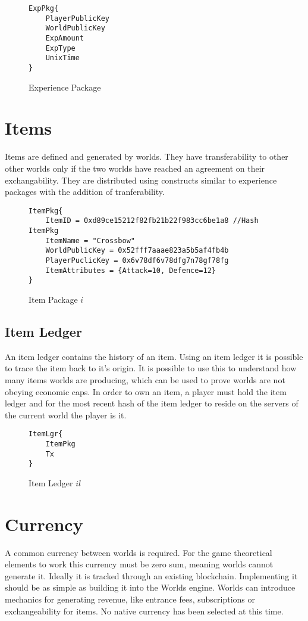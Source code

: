 \documentclass[runningheads,a4paper]{llncs}
\begin{document}
\begin{figure}[H]
\centering
\label{exppkg}
\caption{Experience Package}
\begin{lstlisting}
ExpPkg{
	PlayerPublicKey
	WorldPublicKey
	ExpAmount
	ExpType
	UnixTime
}
\end{lstlisting}
\end{figure}

\section{Items} 
\label{items}
Items are defined and generated by worlds. They have transferability to other other worlds only if the two worlds have reached an agreement on their exchangability. They are distributed using constructs similar to experience packages with the addition of tranferability.

\begin{figure}[H]
\centering
\label{itempkg}
\caption{Item Package $i$}
\begin{lstlisting}
ItemPkg{
	ItemID = 0xd89ce15212f82fb21b22f983cc6be1a8 //Hash ItemPkg 
	ItemName = "Crossbow"
	WorldPublicKey = 0x52fff7aaae823a5b5af4fb4b
	PlayerPuclicKey = 0x6v78df6v78dfg7n78gf78fg
	ItemAttributes = {Attack=10, Defence=12} 
}
\end{lstlisting}
\end{figure}

\subsection{Item Ledger}
\label{IL}
An item ledger contains the history of an item. Using an item ledger it is possible to trace the item back to it's origin. It is possible to use this to understand how many items worlds are producing, which can be used to prove worlds are not obeying economic caps. In order to own an item, a player must hold the item ledger and for the most recent hash of the item ledger to reside on the servers of the current world the player is it.

\begin{figure}[H]
\centering
\label{itemlgr}
\caption{Item Ledger $il$}
\begin{lstlisting}
ItemLgr{
	ItemPkg
	Tx
}
\end{lstlisting}
\end{figure}

\section{Currency}
\label{money}
A common currency between worlds is required. For the game theoretical elements to work this currency must be zero sum, meaning worlds cannot generate it. Ideally it is tracked through an existing blockchain. Implementing it should be as simple as building it into the Worlds engine. Worlds can introduce mechanics for generating revenue, like entrance fees, subscriptions or exchangeability for items. No native currency has been selected at this time.
\end{document}
